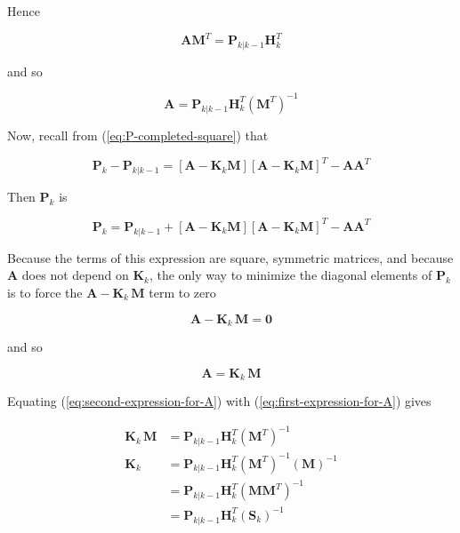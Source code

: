 Hence

\begin{equation*}
    \mathbf{A} \mathbf{M}^T = \mathbf{P}_{k|k-1} \mathbf{H}_k^T
\end{equation*}

and so

\begin{equation}
    \mathbf{A} = \mathbf{P}_{k|k-1} \mathbf{H}_k^T \left( \mathbf{M}^T \right)^{-1}
    \label{eq:first-expression-for-A}
\end{equation}

Now, recall from (\ref{eq:P-completed-square}) that

\begin{equation*}
    \mathbf{P}_{k} - \mathbf{P}_{k|k-1} = \left[ \mathbf{A} - \mathbf{K}_k \mathbf{M} \right] \left[ \mathbf{A} - \mathbf{K}_k \mathbf{M} \right]^T - \mathbf{A} \mathbf{A}^T
\end{equation*}

Then $\mathbf{P}_{k}$ is

\begin{equation*}
    \mathbf{P}_{k} = \mathbf{P}_{k|k-1} + \left[ \mathbf{A} - \mathbf{K}_k \mathbf{M} \right] \left[ \mathbf{A} - \mathbf{K}_k \mathbf{M} \right]^T - \mathbf{A} \mathbf{A}^T
\end{equation*}

Because the terms of this expression are square, symmetric matrices, and because $\mathbf{A}$ 
does not depend on $\mathbf{K}_k$, the only way to minimize the diagonal elements of
$\mathbf{P}_k$ is to force the $\mathbf{A} - \mathbf{K}_k \, \mathbf{M}$ term to zero

\begin{equation*}
    \mathbf{A} - \mathbf{K}_k \, \mathbf{M} = \mathbf{0}
\end{equation*}

and so

\begin{equation}
    \mathbf{A} = \mathbf{K}_k \, \mathbf{M}
    \label{eq:second-expression-for-A}
\end{equation}

Equating (\ref{eq:second-expression-for-A}) with (\ref{eq:first-expression-for-A}) gives

\begin{equation*}
    \begin{aligned}
        \mathbf{K}_k \, \mathbf{M} &= \mathbf{P}_{k|k-1} \mathbf{H}_k^T \left( \mathbf{M}^T \right)^{-1} \\
        \mathbf{K}_k &= \mathbf{P}_{k|k-1} \mathbf{H}_k^T \left( \mathbf{M}^T \right)^{-1} \left( \mathbf{M} \right)^{-1} \\
                     &= \mathbf{P}_{k|k-1} \mathbf{H}_k^T \left( \mathbf{M} \mathbf{M}^T \right)^{-1} \\
                     &= \mathbf{P}_{k|k-1} \mathbf{H}_k^T \left( \mathbf{S}_k \right)^{-1}
    \end{aligned}
\end{equation*}

